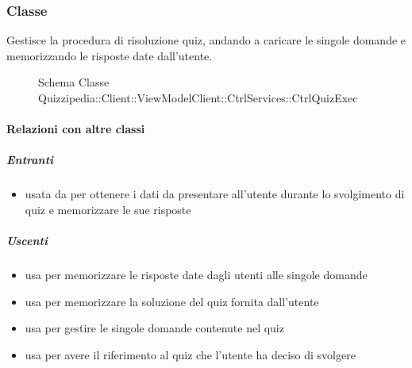 \subsubsection{Classe }
Gestisce la procedura di risoluzione quiz, andando a caricare le singole domande e memorizzando le risposte date dall'utente.
\begin{figure}[H]
\centering
\noindent{}
\caption[Schema Classe CtrlQuizExec]{Schema Classe Quizzipedia::Client::ViewModelClient::CtrlServices::CtrlQuizExec}
\end{figure}
\paragraph{Relazioni con altre classi}
\subparagraph{Entranti}
\begin{itemize}
\item usata da  per ottenere i dati da presentare all'utente durante lo svolgimento di quiz e memorizzare le sue risposte
\end{itemize}
\subparagraph{Uscenti}
\begin{itemize}
\item usa  per memorizzare le risposte date dagli utenti alle singole domande
\item usa  per memorizzare la soluzione del quiz fornita dall'utente
\item usa  per gestire le singole domande contenute nel quiz
\item usa  per avere il riferimento al quiz che l'utente ha deciso di svolgere
\end{itemize}
